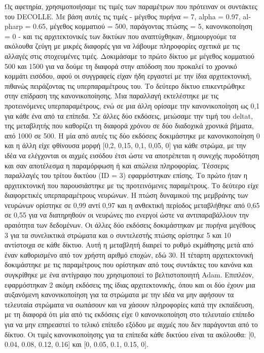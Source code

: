 \documentclass[12pt]{report}
\begin{document}
Ως αφετηρία, χρησιμοποιήσαμε τις τιμές των παραμέτρων που πρότειναν οι συντάκτες του \textlatin{DECOLLE}. Με βάση αυτές τις τιμές - μέγεθος πυρήνα = 7, \textlatin{alpha} = 0.97, \textlatin{alpharp} = 0.65, μέγεθος κομματιού = 500, παράγοντας πτώσης = 5, κανονικοποίηση = 0 - και τις αρχιτεκτονικές των δικτύων που αναπτύχθηκαν, δημιουργούμε τα ακόλουθα ζεύγη με μικρές διαφορές για να λάβουμε πληροφορίες σχετικά με τις αλλαγές στις στοχευμένες τιμές. Δοκιμάσαμε το πρώτο δίκτυο με μέγεθος κομματιού 500 και 1500 για να δούμε τη διαφορά στην απόδοση που προκαλεί το χρονικό κομμάτι εισόδου, αφού οι συγγραφείς είχαν ήδη εργαστεί με την ίδια αρχιτεκτονική, πιθανώς πειράζοντας τις υπερπαραμέτρους του. Το δεύτερο δίκτυο επικεντρώθηκε στην επίδραση της κανονικοποίησης. Μια παραλλαγή εκτελέστηκε με τις προτεινόμενες υπερπαραμέτρους, ενώ σε μια άλλη ορίσαμε την κανονικοποίηση ως 0,1 για κάθε ένα από τα επίπεδα. Σε άλλες δύο εκδόσεις, μειώσαμε την τιμή του \textlatin{deltat}, της μεταβλητής που καθορίζει τη διαφορά χρόνου σε δύο διαδοχικά χρονικά βήματα, από 1000 σε 500. Η μία από αυτές τις δύο εκδόσεις δοκιμάστηκε με κανονικοποίηση 0 και η άλλη είχε φθίνουσα μορφή [0,2, 0,15, 0,1, 0,05, 0] για κάθε στρώμα, με την ιδέα να ελέγχονται οι αιχμές εισόδου έτσι ώστε να αποτρέπεται η συνεχής πυροδότηση και σαν αποτέλεσμα η παραμόρφωση ή και απώλεια πληροφορίας. Τέσσερις παραλλαγές του τρίτου δικτύου (\textlatin{ID} = 3) εφαρμόστηκαν επίσης. Το πρώτο ήταν η αρχιτεκτονική που παρουσιάστηκε με τις προτεινόμενες παραμέτρους. Το δεύτερο είχε διαφορετικές υπερπαραμέτρους νευρώνων. Η πτώση δυναμικού της μεμβράνης των νευρώνων ορίστηκε σε 0,99 αντί 0,97 και η ανθεκτική περίοδος μεταβλήθηκε από 0,65 σε 0,55 για να διατηρηθούν οι νευρώνες πιο ενεργοί ώστε να αντιπαραβάλλουν την αραιότητα των δεδομένων. Οι άλλες δύο εκδόσεις δοκιμάστηκαν με πυρήνα μεγέθους 3 για τα συνελικτικά στρώματα και ο συντελεστής πτώσης ορίστηκε 5 και 10 αντίστοιχα σε κάθε δίκτυο. Αυτή η μεταβλητή διαιρεί το ρυθμό εκμάθησης μετά από έναν καθορισμένο από τον χρήστη αριθμό εποχών, εδώ 30. Η τέταρτη αρχιτεκτονική δοκιμάστηκε με τις παραμέτρους που ορίστηκαν από τους συντάκτες του κανόνα και συγκρίθηκε με ένα αντίγραφο που χρησιμοποιεί το βελτιστοποιητή \textlatin{Adam}. Επιπλέον, εφαρμόστηκαν 2 ακόμη εκδόσεις της ίδιας αρχιτεκτονικής, όπου και οι δύο έχουν μια αυξανόμενη κανονικοποίηση για τα στρώματα με την ιδέα να μην αφήσουν τα τελευταία στρώματα να σωπάσουν και να χάσουν πληροφορίες κατά την εκπαίδευση, με τη διαφορά ότι μία από τις εκδόσεις είχε 0 κανονικοποίηση στο τελευταίο επίπεδο για να μην επηρεαστεί το τελικό επίπεδο εξόδου με αιχμές που δεν παράγονται από το δίκτυο. Οι τιμές κανονικοποίησης για τα επίπεδα κάθε δικτύου είναι τα ακόλουθα: [0, 0.04, 0.08, 0.12, 0.16] και [0, 0.05, 0.1, 0.15, 0].
\end{document}
